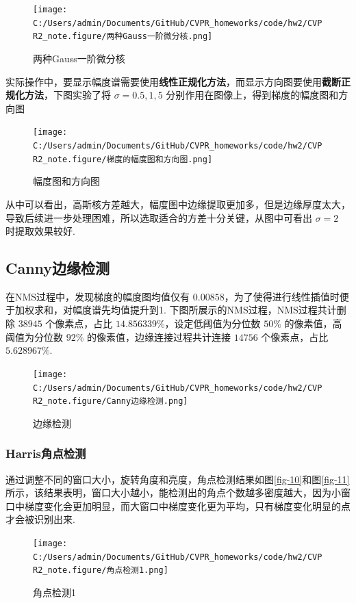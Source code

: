 \documentclass[12pt, a4paper, oneside]{ctexart}
\numberwithin{equation}{section}  %
\begin{document}
\begin{figure}[htbp]
    \centering
    \texttt{[image: C:/Users/admin/Documents/GitHub/CVPR\_homeworks/code/hw2/CVPR2\_note.figure/两种Gauss一阶微分核.png]}
    \caption{两种Gauss一阶微分核\label{fig-6}}
\end{figure}

实际操作中，要显示幅度谱需要使用\textbf{线性正规化方法}，而显示方向图要使用\textbf{截断正规化方法}，下图实验了将
\(\sigma=0.5, 1, 5\) 分别作用在图像上，得到梯度的幅度图和方向图

\begin{figure}[htbp]
    \centering
    \hspace*{-1.5cm}
    \texttt{[image: C:/Users/admin/Documents/GitHub/CVPR\_homeworks/code/hw2/CVPR2\_note.figure/梯度的幅度图和方向图.png]}
    \caption{幅度图和方向图\label{fig-7}}
\end{figure}

从中可以看出，高斯核方差越大，幅度图中边缘提取更加多，但是边缘厚度太大，导致后续进一步处理困难，所以选取适合的方差十分关键，从图中可看出
\(\sigma=2\) 时提取效果较好.

\subsection{Canny边缘检测}
在NMS过程中，发现梯度的幅度图均值仅有
\(0.00858\)，为了使得进行线性插值时便于加权求和，对幅度谱先均值提升到1.
下图所展示的NMS过程，NMS过程共计删除 \(38945\) 个像素点，占比
\(14.856339\%\)，设定低阈值为分位数 \(50\%\) 的像素值，高阈值为分位数
\(92\%\) 的像素值，边缘连接过程共计连接 \(14756\) 个像素点，占比
\(5.628967\%\).

\begin{figure}[htbp]
    \centering
    \texttt{[image: C:/Users/admin/Documents/GitHub/CVPR\_homeworks/code/hw2/CVPR2\_note.figure/Canny边缘检测.png]}
    \caption{边缘检测\label{fig-8}}
\end{figure}
\vspace*{-1cm}
\subsubsection{Harris角点检测}
通过调整不同的窗口大小，旋转角度和亮度，角点检测结果如图\ref{fig-10}和图\ref{fig-11}所示，该结果表明，窗口大小越小，能检测出的角点个数越多密度越大，因为小窗口中梯度变化会更加明显，而大窗口中梯度变化更为平均，只有梯度变化明显的点才会被识别出来.

\begin{figure}[htbp]
    \centering
    \texttt{[image: C:/Users/admin/Documents/GitHub/CVPR\_homeworks/code/hw2/CVPR2\_note.figure/角点检测1.png]}
    \caption{角点检测1\label{fig-9}}
\end{figure}
\end{document}
